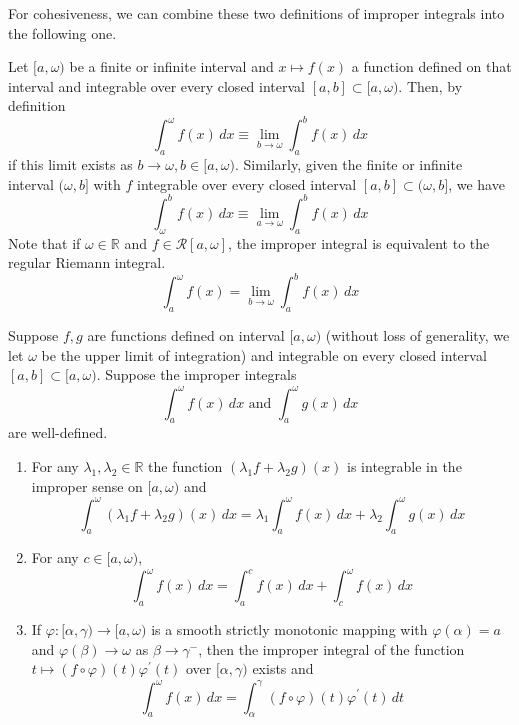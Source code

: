   For cohesiveness, we can combine these two definitions of improper integrals into the following one. 

  \begin{definition}
    Let $[a, \omega)$ be a finite or infinite interval and $x \mapsto f(x)$ a function defined on that interval and integrable over every closed interval $[a, b] \subset [a, \omega)$. Then, by definition
    \[\int_a^\omega f(x)\,dx \equiv \lim_{b \rightarrow \omega} \int_a^b f(x)\,dx\]
    if this limit exists as $b \rightarrow \omega, b \in [a, \omega)$. Similarly, given the finite or infinite interval $(\omega, b]$ with $f$ integrable over every closed interval $[a, b] \subset (\omega, b]$, we have
    \[\int_\omega^b f(x)\,dx \equiv \lim_{a \rightarrow \omega} \int_a^b f(x)\,dx\]
    Note that if $\omega \in \mathbb{R}$ and $f \in \mathcal{R}[a, \omega]$, the improper integral is equivalent to the regular Riemann integral. 
    \[\int_a^\omega f(x) = \lim_{b\rightarrow \omega} \int_a^b f(x)\,dx\]
  \end{definition}

  \begin{lemma}
    Suppose $f, g$ are functions defined on interval $[a, \omega)$ (without loss of generality, we let $\omega$ be the upper limit of integration) and integrable on every closed interval $[a, b] \subset [a, \omega)$. Suppose the improper integrals 
    \[\int_a^\omega f(x)\,dx \text{ and } \int_a^\omega g(x)\,dx\]
    are well-defined. 
    \begin{enumerate}
      \item For any $\lambda_1, \lambda_2 \in \mathbb{R}$ the function $(\lambda_1 f + \lambda_2 g)(x)$ is integrable in the improper sense on $[a, \omega)$ and
      \[\int_a^\omega (\lambda_1 f + \lambda_2 g)(x)\,dx = \lambda_1 \int_a^\omega f(x)\,dx + \lambda_2 \int_a^\omega g(x)\,dx\]
      \item For any $c \in [a, \omega)$, 
      \[\int_a^\omega f(x)\,dx = \int_a^c f(x)\,dx + \int_c^\omega f(x)\,dx\]
      \item If $\varphi: [\alpha, \gamma) \longrightarrow [a, \omega)$ is a smooth strictly monotonic mapping with $\varphi(\alpha) = a$ and $\varphi(\beta) \rightarrow \omega$ as $\beta \rightarrow \gamma^-$, then the improper integral of the function $t \mapsto (f \circ \varphi)(t) \varphi^\prime (t)$ over $[\alpha, \gamma)$ exists and 
      \[\int_a^\omega f(x)\,dx = \int_\alpha^\gamma (f \circ \varphi)(t) \varphi^\prime (t)\,dt\]
    \end{enumerate}
  \end{lemma}

